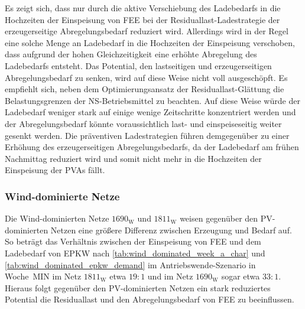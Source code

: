Es zeigt sich, dass nur durch die aktive Verschiebung des Ladebedarfs in die Hochzeiten der Einspeisung von \gls{FEE} bei der Residuallast-Ladestrategie der erzeugerseitige Abregelungsbedarf reduziert wird.
Allerdings wird in der Regel eine solche Menge an Ladebedarf in die Hochzeiten der Einspeisung verschoben, dass aufgrund der hohen Gleichzeitigkeit eine erhöhte Abregelung des Ladebedarfs entsteht.
Das Potential, den lastseitigen und erzeugerseitigen Abregelungsbedarf zu senken, wird auf diese Weise nicht voll ausgeschöpft.
Es empfiehlt sich, neben dem Optimierungsansatz der Residuallast-Glättung die Belastungsgrenzen der \gls{NS}-Betriebsmittel zu beachten.
Auf diese Weise würde der Ladebedarf weniger stark auf einige wenige Zeitschritte konzentriert werden und der Abregelungsbedarf könnte voraussichtlich last- und einspeiseseitig weiter gesenkt werden.
Die präventiven Ladestrategien führen demgegenüber zu einer Erhöhung des erzeugerseitigen Abregelungsbedarfs, da der Ladebedarf am frühen Nachmittag reduziert wird und somit nicht mehr in die Hochzeiten der Einspeisung der \glspl{PVA} fällt.


\subsubsection{Wind-dominierte Netze}\label{chap:wind_cur_results}

Die Wind-dominierten Netze \(1690_{\text{W}}\) und \(1811_{\text{W}}\) weisen gegenüber den \gls{PV}-dominierten Netzen eine größere Differenz zwischen Erzeugung und Bedarf auf.
So beträgt das Verhältnis zwischen der Einspeisung von \gls{FEE} und dem Ladebedarf von \gls{EPKW} nach \autoref{tab:wind_dominated_week_a_char} und \autoref{tab:wind_dominated_epkw_demand} im Antriebswende-Szenario in Woche~MIN im Netz \(1811_{\text{W}}\) etwa \(19:1\) und im Netz \(1690_{\text{W}}\) sogar etwa \(33:1\).
Hieraus folgt gegenüber den \gls{PV}-dominierten Netzen ein stark reduziertes Potential die Residuallast und den Abregelungsbedarf von \gls{FEE} zu beeinflussen.





